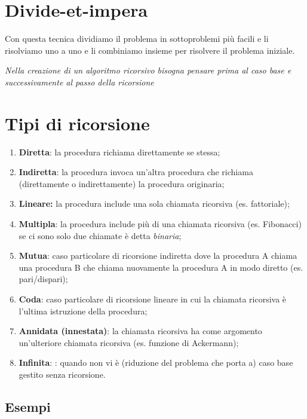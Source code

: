 \section{Divide-et-impera}\label{divide-et-impera}

Con questa tecnica dividiamo il problema in sottoproblemi più facili e
li risolviamo uno a uno e li combiniamo insieme per risolvere il
problema iniziale.

\emph{Nella creazione di un algoritmo ricorsivo bisogna pensare prima al
caso base e successivamente al passo della ricorsione}

\section{Tipi di ricorsione}\label{tipi-di-ricorsione}

\begin{enumerate}
\def\labelenumi{\arabic{enumi}.}
\item
  \textbf{Diretta}: la procedura richiama direttamente se stessa;
\item
  \textbf{Indiretta}: la procedura invoca un'altra procedura che
  richiama (direttamente o indirettamente) la procedura originaria;
\item
  \textbf{Lineare:} la procedura include una sola chiamata ricorsiva
  (es. fattoriale);
\item
  \textbf{Multipla}: la procedura include più di una chiamata ricorsiva
  (es. Fibonacci) se ci sono solo due chiamate è detta \emph{binaria};
\item
  \textbf{Mutua}: caso particolare di ricorsione indiretta dove la
  procedura A chiama una procedura B che chiama nuovamente la procedura
  A in modo diretto (es. pari/dispari);
\item
  \textbf{Coda}: caso particolare di ricorsione lineare in cui la
  chiamata ricorsiva è l'ultima istruzione della procedura;
\item
  \textbf{Annidata (innestata)}: la chiamata ricorsiva ha come argomento
  un'ulteriore chiamata ricorsiva (es. funzione di Ackermann);
\item
  \textbf{Infinita}: : quando non vi è (riduzione del problema che porta
  a) caso base gestito senza ricorsione.
\end{enumerate}

\subsection{Esempi}\label{esempi}

